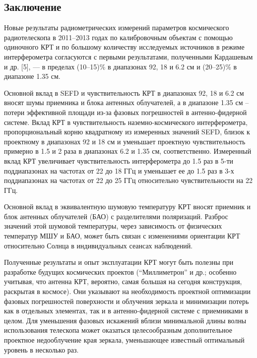\subsection{Заключение}

Новые результаты радиометрических измерений параметров космического радиотелескопа в 2011–2013 годах
по калибровочным объектам с помощью одиночного КРТ и по большому количеству исследуемых источников в
режиме интерферометра согласуются с первыми результатами, полученными Кардашевым и др. [5], --- в
пределах (10--15)\% в диапазонах 92, 18 и 6.2 см и (20--25)\% в диапазоне 1.35 см.

Основной вклад в SEFD и чувствительность КРТ в диапазонах 92, 18 и 6.2 см вносят шумы приемника и
блока антенных облучателей, а в диапазоне 1.35 см – потери эффективной площади из-за фазовых
погрешностей в антенно-фидерной системе. Вклад КРТ в чувствительность наземно-космического
интерферометра, пропорциональный корню квадратному из измеренных значений SEFD, близок к проектному
в диапазонах 92 и 18 см и уменьшает проектную чувствительность примерно в 1.5 и 2 раза в диапазонах
6.2 и 1.35 см, соответственно. Измеренный вклад КРТ увеличивает чувствительность интерферометра до
1.5 раз в 5-ти поддиапазонах на частотах от 22 до 18 ГГц и уменьшает ее до 1.5 раз в 3-х
поддиапазонах на частотах от 22 до 25 ГГц относительно чувствительности на 22 ГГц.

Основной вклад в эквивалентную шумовую температуру КРТ вносят приемник и блок антенных облучателей
(БАО) с разделителями поляризаций. Разброс значений этой шумовой температуры, через зависимость от
физических температур МШУ и БАО, может быть связан с изменениями ориентации КРТ относительно Солнца
в индивидуальных сеансах наблюдений.

Полученные результаты и опыт эксплуатации КРТ могут быть полезны при разработке будущих космических
проектов (``Миллиметрон'' и др.; особенно учитывая, что антенна КРТ, вероятно, самая большая на
сегодня конструкция, раскрытая в космосе). Они указывают на необходимость проектной оптимизации
фазовых погрешностей поверхности и облучения зеркала и минимизации потерь как в отдельных элементах,
так и в антенно-фидерной системе с приемниками в целом. Для уменьшения фазовых искажений вблизи
минимальной длины волны использования телескопа может оказаться целесообразным дополнительное
проектное недооблучение края зеркала, уменьшающее известный оптимальный уровень в несколько раз.
